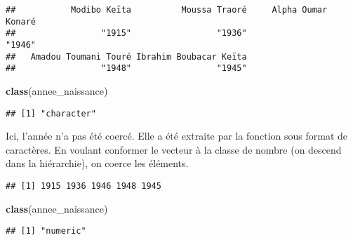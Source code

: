\documentclass[]{book}
\newenvironment{Shaded}{\begin{snugshade}}{\end{snugshade}}
\newcommand{\KeywordTok}[1]{\textcolor[rgb]{0.13,0.29,0.53}{\textbf{#1}}}
\newcommand{\StringTok}[1]{\textcolor[rgb]{0.31,0.60,0.02}{#1}}
\newcommand{\NormalTok}[1]{#1}
\begin{document}
\begin{Shaded}
\end{Shaded}

\begin{verbatim}
##           Modibo Keïta          Moussa Traoré     Alpha Oumar Konaré 
##                 "1915"                 "1936"                 "1946" 
##   Amadou Toumani Touré Ibrahim Boubacar Keïta 
##                 "1948"                 "1945"
\end{verbatim}

\begin{Shaded}
\begin{Highlighting}[]
\KeywordTok{class}\NormalTok{(annee_naissance)}
\end{Highlighting}
\end{Shaded}

\begin{verbatim}
## [1] "character"
\end{verbatim}

Ici, l'année n'a pas été coercé. Elle a été extraite par la fonction
sous format de caractères. En voulant conformer le vecteur à la classe
de nombre (on descend dans la hiérarchie), on coerce les éléments.

\begin{Shaded}
\end{Shaded}

\begin{verbatim}
## [1] 1915 1936 1946 1948 1945
\end{verbatim}

\begin{Shaded}
\begin{Highlighting}[]
\KeywordTok{class}\NormalTok{(annee_naissance)}
\end{Highlighting}
\end{Shaded}

\begin{verbatim}
## [1] "numeric"
\end{verbatim}
\end{document}
